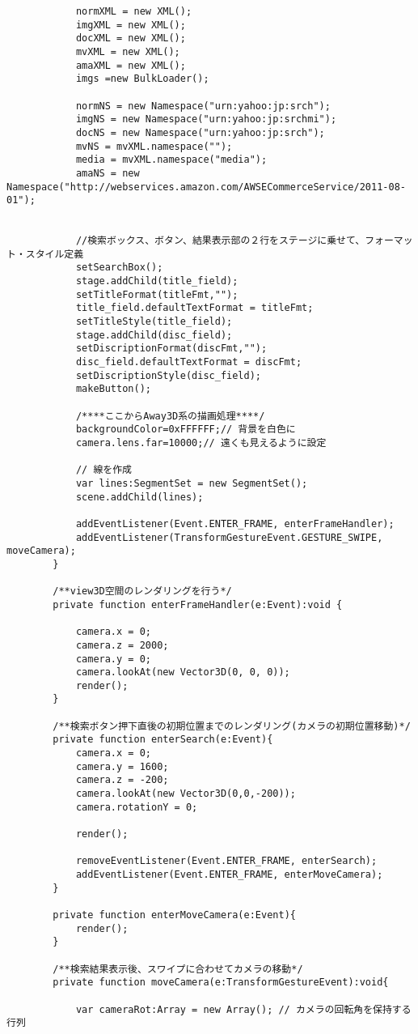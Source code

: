 {\begin{verbatim}
			normXML = new XML();
			imgXML = new XML();
			docXML = new XML();
			mvXML = new XML();
			amaXML = new XML();
			imgs =new BulkLoader();
			
			normNS = new Namespace("urn:yahoo:jp:srch");
			imgNS = new Namespace("urn:yahoo:jp:srchmi");
			docNS = new Namespace("urn:yahoo:jp:srch");
			mvNS = mvXML.namespace("");
			media = mvXML.namespace("media");
			amaNS = new Namespace("http://webservices.amazon.com/AWSECommerceService/2011-08-01");
			
			
			//検索ボックス、ボタン、結果表示部の２行をステージに乗せて、フォーマット・スタイル定義
			setSearchBox();
			stage.addChild(title_field);
			setTitleFormat(titleFmt,"");
			title_field.defaultTextFormat = titleFmt;
			setTitleStyle(title_field);
			stage.addChild(disc_field);
			setDiscriptionFormat(discFmt,"");
			disc_field.defaultTextFormat = discFmt;
			setDiscriptionStyle(disc_field);
			makeButton();
			
			/****ここからAway3D系の描画処理****/
			backgroundColor=0xFFFFFF;// 背景を白色に
			camera.lens.far=10000;// 遠くも見えるように設定
			
			// 線を作成
			var lines:SegmentSet = new SegmentSet();
			scene.addChild(lines);
			
			addEventListener(Event.ENTER_FRAME, enterFrameHandler);
			addEventListener(TransformGestureEvent.GESTURE_SWIPE, moveCamera);
		}

		/**view3D空間のレンダリングを行う*/
		private function enterFrameHandler(e:Event):void {

			camera.x = 0;
			camera.z = 2000;
			camera.y = 0;
			camera.lookAt(new Vector3D(0, 0, 0));
			render();
		}
		
		/**検索ボタン押下直後の初期位置までのレンダリング(カメラの初期位置移動)*/
		private function enterSearch(e:Event){
			camera.x = 0;
			camera.y = 1600;
			camera.z = -200;
			camera.lookAt(new Vector3D(0,0,-200));
			camera.rotationY = 0;

			render();
			
			removeEventListener(Event.ENTER_FRAME, enterSearch);
			addEventListener(Event.ENTER_FRAME, enterMoveCamera);
		}
		
		private function enterMoveCamera(e:Event){
			render();
		}
		
		/**検索結果表示後、スワイプに合わせてカメラの移動*/
		private function moveCamera(e:TransformGestureEvent):void{

			var cameraRot:Array = new Array(); // カメラの回転角を保持する行列
			

\end{verbatim}}

